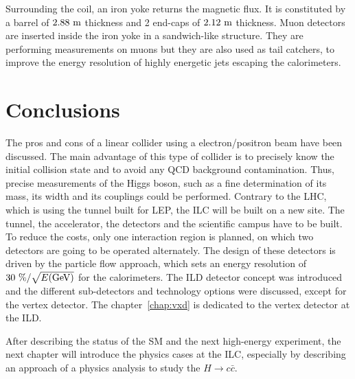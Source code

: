      Surrounding the coil, an iron yoke returns the magnetic flux. 
     It is constituted by a barrel of $2.88~\rm{m}$ thickness and 2 end-caps of $2.12~\rm{m}$ thickness.
     Muon detectors are inserted inside the iron yoke in a sandwich-like structure.
     They are performing measurements on muons but they are also used as tail catchers, to improve the energy resolution of highly energetic jets escaping the calorimeters. 


   \section{Conclusions}

   The pros and cons of a linear collider using a electron/positron beam have been discussed. 
   The main advantage of this type of collider is to precisely know the initial collision state and to avoid any \gls{QCD} background contamination.
   Thus, precise measurements of the Higgs boson, such as a fine determination of its mass, its width and its couplings could be performed.
   Contrary to the \gls{LHC}, which is using the tunnel built for \gls{LEP}, the \gls{ILC} will be built on a new site.
   The tunnel, the accelerator, the detectors and the scientific campus have to be built. 
   To reduce the costs, only one interaction region is planned, on which two detectors are going to be operated alternately.
   The design of these detectors is driven by the particle flow approach, which sets an energy resolution of $30~\%/\sqrt{E\rm{(GeV)}}$ for the calorimeters.
   The \gls{ILD} detector concept was introduced and the different sub-detectors and technology options were discussed, except for the vertex detector.
   The chapter~\ref{chap:vxd} is dedicated to the vertex detector at the \gls{ILD}.
   
   After describing the status of the \gls{SM} and the next high-energy experiment, the next chapter will introduce the physics cases at the \gls{ILC}, especially by describing an approach of a physics analysis to study the $H \rightarrow c\bar{c}$.

